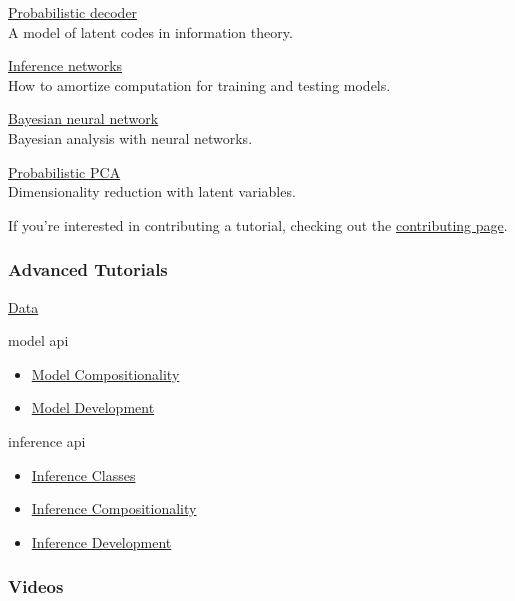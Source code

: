 \href{decoder}{Probabilistic decoder} \\
A model of latent codes in information theory.

\href{inference-networks}{Inference networks} \\
How to amortize computation for training and testing models.

\href{bayesian-neural-network}{Bayesian neural network} \\
Bayesian analysis with neural networks.

\href{probabilistic-pca}{Probabilistic PCA} \\
Dimensionality reduction with latent variables.

If you're interested in contributing a tutorial, checking out the
\href{/contributing}{contributing page}.

\subsubsection{Advanced Tutorials}

\href{data}{Data}

model api

\begin{itemize}
  \item \href{model-compositionality}{Model Compositionality}
  \item \href{model-development}{Model Development}
\end{itemize}

inference api

\begin{itemize}
  \item \href{inference-classes}{Inference Classes}
  \item \href{inference-compositionality}{Inference Compositionality}
  \item \href{inference-development}{Inference Development}
\end{itemize}

\subsubsection{Videos}

